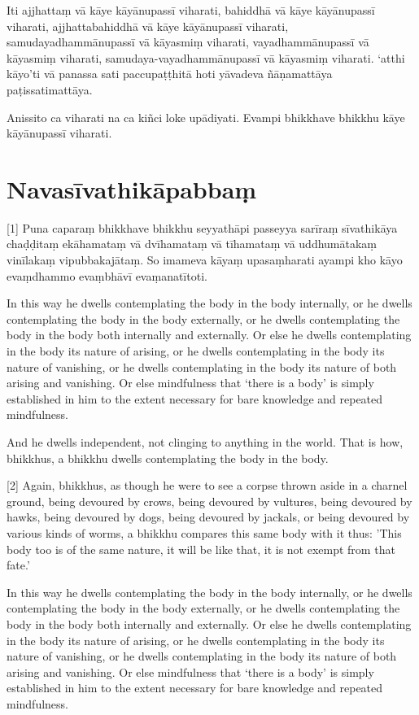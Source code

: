 Iti ajjhattaṃ vā kāye kāyānupassī viharati, bahiddhā vā kāye kāyānupassī
viharati, ajjhattabahiddhā vā kāye kāyānupassī viharati, samudayadhammānupassī
vā kāyasmiṃ viharati, vayadhammānupassī vā kāyasmiṃ viharati,
samudaya-vayadhammānupassī vā kāyasmiṃ viharati. `atthi kāyo'ti vā panassa sati
paccupaṭṭhitā hoti yāvadeva ñāṇamattāya paṭissatimattāya.

Anissito ca viharati na ca kiñci loke upādiyati. Evampi bhikkhave bhikkhu kāye
kāyānupassī viharati.


\section*{Navasīvathikāpabbaṃ}

[1] Puna caparaṃ bhikkhave bhikkhu seyyathāpi passeyya sarīraṃ sīvathikāya chaḍḍitaṃ
ekāhamataṃ vā dvīhamataṃ vā tīhamataṃ vā uddhumātakaṃ vinīlakaṃ vipubbakajātaṃ.
So imameva kāyaṃ upasaṃharati ayampi kho kāyo evaṃdhammo evaṃbhāvī
evaṃanatītoti.

\englishPage

In this way he dwells contemplating the body in the body internally, or he
dwells contemplating the body in the body externally, or he dwells contemplating
the body in the body both internally and externally. Or else he dwells
contemplating in the body its nature of arising, or he dwells contemplating in
the body its nature of vanishing, or he dwells contemplating in the body its
nature of both arising and vanishing. Or else mindfulness that ‘there is a body’
is simply established in him to the extent necessary for bare knowledge and
repeated mindfulness.

And he dwells independent, not clinging to anything in the world. That is how,
bhikkhus, a bhikkhu dwells contemplating the body in the body.

[2] Again, bhikkhus, as though he were to see a corpse thrown aside in a charnel
ground, being devoured by crows, being devoured by vultures, being devoured by
hawks, being devoured by dogs, being devoured by jackals, or being devoured by
various kinds of worms, a bhikkhu compares this same body with it thus: 'This
body too is of the same nature, it will be like that, it is not exempt from that
fate.'

In this way he dwells contemplating the body in the body internally, or he
dwells contemplating the body in the body externally, or he dwells contemplating
the body in the body both internally and externally. Or else he dwells
contemplating in the body its nature of arising, or he dwells contemplating in
the body its nature of vanishing, or he dwells contemplating in the body its
nature of both arising and vanishing. Or else mindfulness that ‘there is a body’
is simply established in him to the extent necessary for bare knowledge and
repeated mindfulness.

